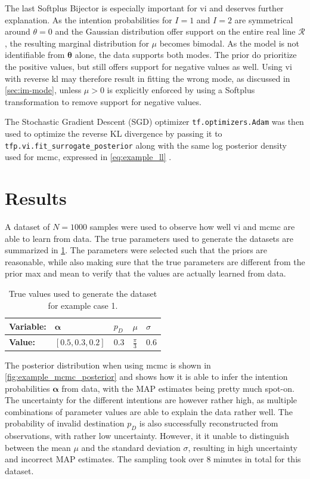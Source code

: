 The last Softplus Bijector is especially important for \acrshort{vi} and deserves further explanation. As the intention probabilities for $I=1$ and $I=2$ are symmetrical around $\theta=0$ and the Gaussian distribution offer support on the entire real line $\mathcal{R}$, the resulting marginal distribution for $\mu$ becomes bimodal. As the model is not identifiable from $\boldsymbol{\theta}$ alone, the data supports both modes. The prior do prioritize the positive values, but still offers support for negative values as well.  Using \acrshort{vi} with reverse \acrshort{kl} may therefore result in fitting the wrong mode, as discussed in \cref{sec:im-mode}, unless $\mu > 0$ is explicitly enforced by using a Softplus transformation to remove support for negative values. 

The Stochastic Gradient Descent (SGD) optimizer \texttt{tf.optimizers.Adam} was then used to optimize the reverse KL divergence by passing it to \texttt{tfp.vi.fit\_surrogate\_posterior} along with the same log posterior density used for \acrshort{mcmc}, expressed in \cref{eq:example_ll} \cite{tensorflow2015-whitepaper}. 

\section{Results}
A dataset of $N=1000$ samples were used to observe how well \acrshort{vi} and \acrshort{mcmc} are able to learn from data. The true parameters used to generate the datasets are summarized in \cref{tbl:example_params}. The parameters were selected such that the priors are reasonable, while also making sure that the true parameters are different from the prior max and mean to verify that the values are actually learned from data. 
\begin{table}[h]
\centering
\begin{tabular}{lllll}
\textbf{Variable:}   & $\boldsymbol{\alpha}$ & $p_D$ & $\mu$                  & $\sigma$         \\ \hline
\textbf{Value:} & $[0.5, 0.3, 0.2]$     & $0.3$ & $\frac{\pi}{3}$ & $0.6$ \\
\end{tabular}
\caption{True values used to generate the dataset for example case 1.}
\label{tbl:example_params}
\end{table}


The posterior distribution when using \acrshort{mcmc} is shown in \cref{fig:example_mcmc_posterior} and shows how it is able to infer the intention probabilities $\boldsymbol{\alpha}$ from data, with the MAP estimates being pretty much spot-on. The uncertainty for the different intentions are however rather high, as multiple combinations of parameter values are able to explain the data rather well. The probability of invalid destination $p_D$ is also successfully reconstructed from observations, with rather low uncertainty. However, it it unable to distinguish between the mean $\mu$ and the standard deviation $\sigma$, resulting in high uncertainty and incorrect MAP estimates. The sampling took over 8 minutes in total for this dataset. 

